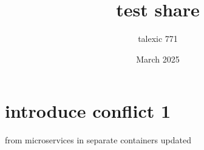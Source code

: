 \documentclass{article}
\title{test share}
\author{talexic 771 }
\date{March 2025}
\begin{document}
\maketitle

\section{introduce conflict 1}
from microservices in separate containers updated
\end{document}
